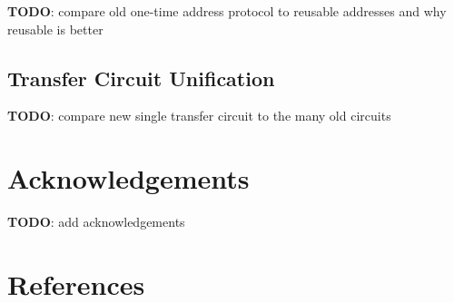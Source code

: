 \documentclass[a4paper]{article}
\newcommand{\lsection}[2]{\def\sectionlabel{#2} \section{#1}\label{sec:#2}}
\newcommand{\TODO}[1]{{\color{red}\textbf{TODO}}: #1}
\theoremstyle{definition}
\newcommand{\Transfer}{{\textsf{Transfer}}}
\begin{document}
\TODO{compare old one-time address protocol to reusable addresses and why reusable is better}

\subsection{\Transfer{} Circuit Unification}

\TODO{compare new single transfer circuit to the many old circuits}

\lsection{Acknowledgements}{acknowledgements}

\TODO{add acknowledgements}

\lsection{References}{references}


\end{document}

